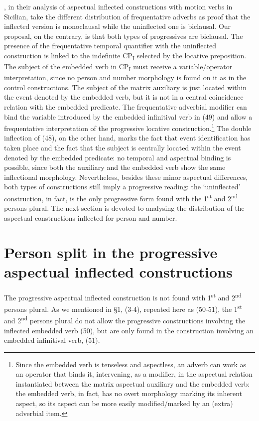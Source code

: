 \documentclass[output=paper]{langsci/langscibook}
\begin{document}
\citet{Cardinaletti2003}, in their analysis of aspectual inflected constructions with motion verbs in Sicilian, take the different distribution of frequentative adverbs as proof that the inflected version is monoclausal while the uninflected one is biclausal. Our proposal, on the contrary, is that both types of progressives are biclausal. The presence of the frequentative temporal quantifier with the uninflected construction is linked to the indefinite CP\textsubscript{I} selected by the locative preposition. The subject of the embedded verb in CP\textsubscript{I} must receive a variable\slash operator interpretation, since no person and number morphology is found on it as in the control constructions. The subject of the matrix auxiliary is just located within the event denoted by the embedded verb, but it is not in a central coincidence relation with the embedded predicate. The frequentative adverbial modifier can bind the variable introduced by the embedded infinitival verb in (49) and allow a frequentative interpretation of the progressive locative construction.\footnote{Since the embedded verb is tenseless and aspectless, an adverb can work as an operator that binds it, intervening, as a modifier, in the aspectual relation instantiated between the matrix aspectual auxiliary and the embedded verb: the embedded verb, in fact, has no overt morphology marking its inherent aspect, so its aspect can be more easily modified\slash marked by an (extra) adverbial item.} The double inflection of (48), on the other hand, marks the fact that event identification has taken place and the fact that the subject is centrally located within the event denoted by the embedded predicate: no temporal and aspectual binding is possible, since both the auxiliary and the embedded verb show the same inflectional morphology. Nevertheless, besides these minor aspectual differences, both types of constructions still imply a progressive reading: the ‘uninflected’ construction, in fact, is the only progressive form found with the 1\textsuperscript{st} and 2\textsuperscript{nd} persons plural. The next section is devoted to analysing the distribution of the aspectual constructions inflected for person and number.

\section{Person split in the progressive aspectual inflected constructions}%

The progressive aspectual inflected construction is not found with 1\textsuperscript{st} and 2\textsuperscript{nd} persons plural. As we mentioned in §1, (3-4), repeated here as (50-51), the 1\textsuperscript{st} and 2\textsuperscript{nd} persons plural do not allow the progressive constructions involving the inflected embedded verb (50), but are only found in the construction involving an embedded infinitival verb, (51). 
\end{document}
